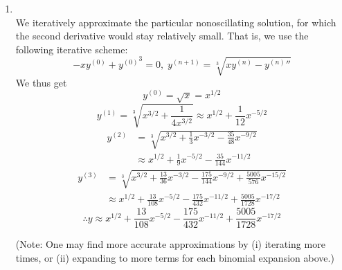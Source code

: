 \begin{enumerate}[wide, labelindent=0pt, label= (\alph*)]
\item \mbox{}\\
We iteratively approximate the particular nonoscillating solution, for which the second derivative would stay relatively small.
That is, we use the following iterative scheme:
\[
	-xy^{(0)} + {y^{(0)}}^3 = 0,\;
	y^{(n + 1)} = \sqrt[3]{xy^{(n)} - {y^{(n)}}''}
\]
We thus get
\[
	y^{(0)} = \sqrt{x} = x^{1/2}
\]
\[
	y^{(1)}
	= \sqrt[3]{x^{3/2} + \frac{1}{4x^{3/2}}}
	\approx x^{1/2} + \frac{1}{12} x^{-5/2}
\]
\begin{align*}
	y^{(2)}
	&= \sqrt[3]{x^{3/2} + \frac{1}{3}x^{-3/2} - \frac{35}{48}x^{-9/2}} \\
	&\approx x^{1/2} + \frac{1}{9}x^{-5/2} - \frac{35}{144}x^{-11/2}
\end{align*}
\begin{align*}
	y^{(3)}
	&= \sqrt[3]{x^{3/2} + \frac{13}{36}x^{-3/2} - \frac{175}{144}x^{-9/2} + \frac{5005}{576}x^{-15/2}} \\
	&\approx x^{1/2} + \frac{13}{108}x^{-5/2} - \frac{175}{432}x^{-11/2} + \frac{5005}{1728}x^{-17/2}
\end{align*}
\[
	\therefore y \approx x^{1/2} + \frac{13}{108}x^{-5/2} - \frac{175}{432}x^{-11/2} + \frac{5005}{1728}x^{-17/2}
\]

(Note: One may find more accurate approximations by (i) iterating more times, or (ii) expanding to more terms for each binomial expansion above.)

\end{enumerate}